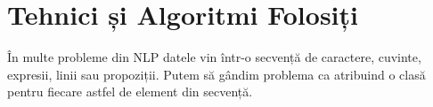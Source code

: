 \chapter{Tehnici și Algoritmi Folosiți}

În multe probleme din NLP datele vin într-o secvență de caractere, cuvinte, expresii, linii sau propoziții. Putem să gândim problema ca atribuind o clasă pentru fiecare astfel de element din secvență.